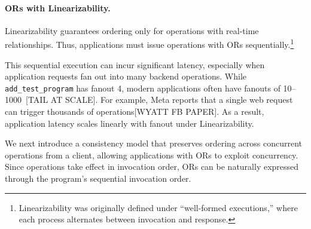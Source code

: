 
\paragraph{ORs with Linearizability.}
Linearizability guarantees ordering only for operations with real-time relationships. Thus, applications must issue operations with ORs sequentially.\footnote{Linearizability was originally defined under ``well-formed executions,'' where each process alternates between invocation and response.}

This sequential execution can incur significant latency, especially when application requests fan out into many backend operations. While \texttt{add\_test\_program} has fanout 4, modern applications often have fanouts of 10–1000~[TAIL AT SCALE]. For example, Meta reports that a single web request can trigger thousands of operations[WYATT FB PAPER]. As a result, application latency scales linearly with fanout under Linearizability.

We next introduce a consistency model that preserves ordering across concurrent operations from a client, allowing applications with ORs to exploit concurrency. Since operations take effect in invocation order, ORs can be naturally expressed through the program’s sequential invocation order.